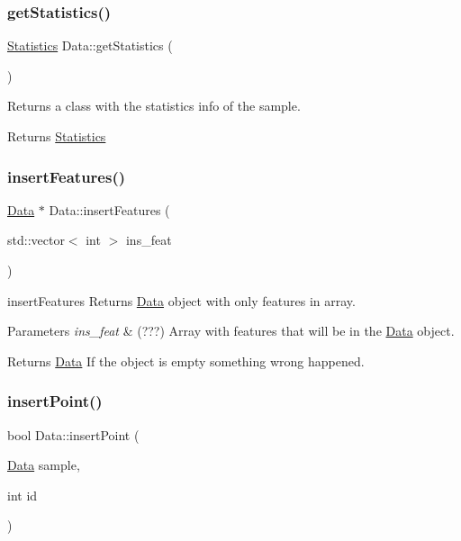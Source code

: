\subsubsection{\texorpdfstring{get\+Statistics()}{getStatistics()}}
{\footnotesize\ttfamily \hyperlink{class_statistics}{Statistics} Data\+::get\+Statistics (\begin{DoxyParamCaption}{ }\end{DoxyParamCaption})}



Returns a class with the statistics info of the sample. 

\begin{DoxyReturn}{Returns}
\hyperlink{class_statistics}{Statistics} 
\end{DoxyReturn}
\mbox{\label{class_data_a5eb92a397e4eafb02f3c012658c78b37}} 
\subsubsection{\texorpdfstring{insert\+Features()}{insertFeatures()}}
{\footnotesize\ttfamily \hyperlink{class_data}{Data} $\ast$ Data\+::insert\+Features (\begin{DoxyParamCaption}\item[{std\+::vector$<$ int $>$}]{ins\+\_\+feat }\end{DoxyParamCaption})}



insert\+Features Returns \hyperlink{class_data}{Data} object with only features in array. 


\begin{DoxyParams}{Parameters}
{\em ins\+\_\+feat} & (???) Array with features that will be in the \hyperlink{class_data}{Data} object. \\
\hline
\end{DoxyParams}
\begin{DoxyReturn}{Returns}
\hyperlink{class_data}{Data} If the object is empty something wrong happened. 
\end{DoxyReturn}
\mbox{\label{class_data_abb6aade47d78a284301c32e82b2cbee2}} 
\subsubsection{\texorpdfstring{insert\+Point()}{insertPoint()}\hspace{0.1cm}{\footnotesize\ttfamily [1/2]}}
{\footnotesize\ttfamily bool Data\+::insert\+Point (\begin{DoxyParamCaption}\item[{\hyperlink{class_data}{Data}}]{sample,  }\item[{int}]{id }\end{DoxyParamCaption})}



